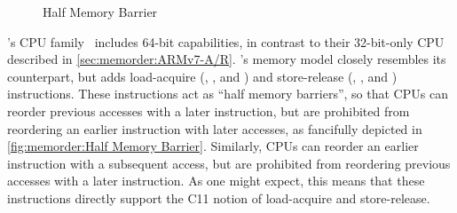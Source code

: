 \begin{figure}
\centering
{}
\caption{Half Memory Barrier}
\end{figure}

\ARM's  CPU family~\cite{ARMv8A:2017}
includes 64-bit capabilities,
in contrast to their 32-bit-only CPU described in
\cref{sec:memorder:ARMv7-A/R}.
's memory model closely resembles its  counterpart,
but adds load-acquire (, , and )
and store-release (, , and )
instructions.
These instructions act as ``half memory barriers'', so that
 CPUs can reorder previous accesses with a later 
instruction, but are prohibited from reordering an earlier 
instruction with later accesses, as fancifully depicted in
\cref{fig:memorder:Half Memory Barrier}.
Similarly,  CPUs can reorder an earlier  instruction with
a subsequent access, but are prohibited from reordering
previous accesses with a later  instruction.
As one might expect, this means that these instructions directly support
the C11 notion of load-acquire and store-release.

